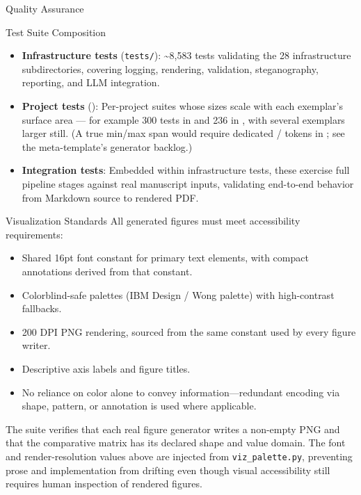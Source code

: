 \documentclass[
  ignorenonframetext,
]{beamer}
\providecommand{\tightlist}{%
  \setlength{\itemsep}{0pt}\setlength{\parskip}{0pt}}
\begin{document}
\begin{frame}{Quality Assurance}
\begin{block}{Test Suite Composition}
\begin{itemize}
\tightlist
\item
  \textbf{Infrastructure tests} (\texttt{tests/}): \textasciitilde8,583
  tests validating the 28 infrastructure subdirectories, covering
  logging, rendering, validation, steganography, reporting, and LLM
  integration.
\item
  \textbf{Project tests} (): Per-project
  suites whose sizes scale with each exemplar's surface area --- for
  example 300 tests in  and 236
  in , with several exemplars larger
  still. (A true min/max span would require dedicated
  /
  tokens in ; see the
  meta-template's generator backlog.)
\item
  \textbf{Integration tests}: Embedded within infrastructure tests,
  these exercise full pipeline stages against real manuscript inputs,
  validating end-to-end behavior from Markdown source to rendered PDF.
\end{itemize}
\end{block}

\begin{block}{Visualization Standards}
\protect{}\label{visualization-standards}
All generated figures must meet accessibility requirements:

\begin{itemize}
\tightlist
\item
  Shared 16pt font constant for primary text elements, with compact
  annotations derived from that constant.
\item
  Colorblind-safe palettes (IBM Design / Wong palette) with
  high-contrast fallbacks.
\item
  200 DPI PNG rendering, sourced from the same constant used by every
  figure writer.
\item
  Descriptive axis labels and figure titles.
\item
  No reliance on color alone to convey information---redundant encoding
  via shape, pattern, or annotation is used where applicable.
\end{itemize}

The  suite verifies that each real
figure generator writes a non-empty PNG and that the comparative matrix
has its declared shape and value domain. The font and render-resolution
values above are injected from \texttt{viz\_palette.py}, preventing
prose and implementation from drifting even though visual accessibility
still requires human inspection of rendered figures.
\end{block}
\end{frame}
\end{document}
